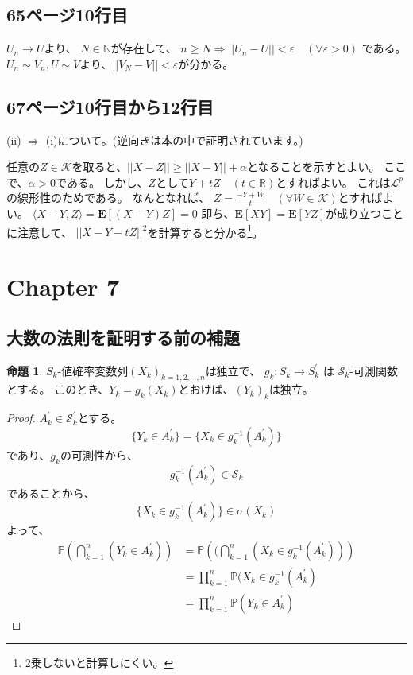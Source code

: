 \documentclass[11pt, a4paper]{jsarticle}
\theoremstyle{definition}
\newtheorem*{prop*}{命題}
\newcommand{\NN}{{\mathbb{N}}} %
\newcommand{\RR}{{\mathbb{R}}} %
\newcommand{\PP}{{\mathbb{P}}} %
\begin{document}
    \subsection{65ページ10行目}
      $U_n \to U$より、
      $N \in \NN$が存在して、
      $n \ge N \Rightarrow ||U_n - U|| < \varepsilon \quad (\forall \varepsilon > 0)$
      である。
      $U_n \sim V_n, U \sim V$より、$||V_N - V|| < \varepsilon$が分かる。

    \subsection{67ページ10行目から12行目}
      (ii) $\Rightarrow$ (i)について。(逆向きは本の中で証明されています。)

      任意の$Z \in \mathcal{K}$を取ると、$||X - Z|| \ge ||X - Y|| + \alpha$となることを示すとよい。
      ここで、$\alpha > 0$である。
      しかし、$Z$として$Y + tZ \quad (t \in \RR)$とすればよい。
      これは$\mathcal{L}^p$の線形性のためである。
      なんとなれば、
      $Z = \frac{-Y+ W}{t} \quad (\forall W \in \mathcal{K})$とすればよい。
      $\langle X - Y, Z \rangle = \mathbf{E}[(X - Y)Z] = 0$
      即ち、$\mathbf{E}[XY] = \mathbf{E}[YZ]$が成り立つことに注意して、
      $||X - Y - tZ||^2$を計算すると分かる\footnote{2乗しないと計算しにくい。}。

  \section{Chapter 7}
    \subsection{大数の法則を証明する前の補題}
      \begin{prop*}
        $S_k$-値確率変数列$(X_k)_{k = 1,2,\cdots, n}$は独立で、
        $g_k \colon S_k \to S_k^{\prime}$
        は
        $\mathcal{S}_k$-可測関数とする。
        このとき、$Y_k = g_k(X_k)$とおけば、$(Y_k)_k$は独立。
      \end{prop*}
      \begin{proof}
        $A_k^{\prime} \in \mathcal{S}_k^{\prime}$とする。
        \[
          \{Y_k \in A_k^{\prime}\} = \{X_k \in g_k^{-1}(A_k^{\prime})\}
        \]
        であり、$g_k$の可測性から、
        \[
          g_k^{-1}(A_k^{\prime}) \in \mathcal{S}_k
        \]
        であることから、
        \[
          \{X_k \in g_k^{-1}(A_k^{\prime})\} \in \sigma(X_k)
        \]
        よって、
        \begin{align*}
          \PP \left(\bigcap_{k=1}^{n} (Y_k \in A_k^{\prime})\right) &= \PP \left((\bigcap_{k=1}^{n} (X_k \in g_k^{-1}(A_k^{\prime}))\right) \\
          &= \prod_{k=1}^n \PP(X_k \in g_k^{-1}(A_k^{\prime}) \\
          &= \prod_{k=1}^n \PP(Y_k \in A_k^{\prime})
        \end{align*}
      \end{proof}
\end{document}
